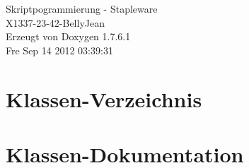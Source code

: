 \documentclass[a4paper]{book}
\begin{document}
\hypersetup{pageanchor=false,citecolor=blue}
\begin{titlepage}
\vspace*{7cm}
\begin{center}
{\Large \-Skriptpogrammierung -\/ \-Stapleware \\[1ex]\large \-X1337-\/23-\/42-\/\-Belly\-Jean }\\
\vspace*{1cm}
{\large \-Erzeugt von Doxygen 1.7.6.1}\\
\vspace*{0.5cm}
{\small Fre Sep 14 2012 03:39:31}\\
\end{center}
\end{titlepage}
\clearemptydoublepage
{}
\tableofcontents
\clearemptydoublepage
{}
\hypersetup{pageanchor=true,citecolor=blue}
\chapter{\-Klassen-\/\-Verzeichnis}

\chapter{\-Klassen-\/\-Dokumentation}











\printindex
\end{document}
